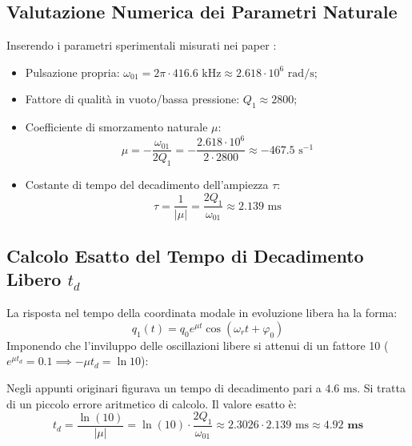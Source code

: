 \documentclass[11pt,a4paper]{article}
\begin{document}
\subsection{Valutazione Numerica dei Parametri Naturale}
Inserendo i parametri sperimentali misurati nei paper \cite{Frangi2023, Nastro2026}:
\begin{itemize}
    \item Pulsazione propria: $\omega_{01} = 2\pi \cdot 416.6\text{ kHz} \approx 2.618 \cdot 10^6\text{ rad/s}$;
    \item Fattore di qualità in vuoto/bassa pressione: $Q_1 \approx 2800$;
    \item Coefficiente di smorzamento naturale $\mu$:
    \begin{equation}
        \mu = -\frac{\omega_{01}}{2 Q_1} = -\frac{2.618 \cdot 10^6}{2 \cdot 2800} \approx -467.5\text{ s}^{-1}
    \end{equation}
    \item Costante di tempo del decadimento dell'ampiezza $\tau$:
    \begin{equation}
        \tau = \frac{1}{|\mu|} = \frac{2 Q_1}{\omega_{01}} \approx 2.139\text{ ms}
    \end{equation}
\end{itemize}

\subsection{Calcolo Esatto del Tempo di Decadimento Libero \texorpdfstring{$t_d$}{td}}
La risposta nel tempo della coordinata modale in evoluzione libera ha la forma:
\begin{equation}
    q_1(t) = q_0 e^{\mu t} \cos(\omega_r t + \varphi_0)
\end{equation}
Imponendo che l'inviluppo delle oscillazioni libere si attenui di un fattore 10 ($e^{\mu t_d} = 0.1 \implies -\mu t_d = \ln 10$):

\begin{corrbox}
Negli appunti originari figurava un tempo di decadimento pari a $4.6\text{ ms}$. Si tratta di un piccolo errore aritmetico di calcolo. Il valore esatto è:
\begin{equation}
    t_d = \frac{\ln(10)}{|\mu|} = \ln(10) \cdot \frac{2 Q_1}{\omega_{01}} \approx 2.3026 \cdot 2.139\text{ ms} \approx \mathbf{4.92\text{ ms}}
\end{equation}
\end{corrbox}
\end{document}
